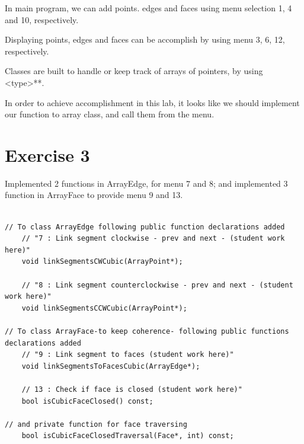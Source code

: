 \documentclass{article}
\begin{document}
In main program, we can add points. edges and faces using menu selection 1, 4 and 10, respectively.

Displaying points, edges and faces can be accomplish by using menu 3, 6, 12, respectively.

Classes are built to handle or keep track of arrays of pointers, by using <type>**.

In order to achieve accomplishment in this lab, it looks like we should implement our function to array class, and call them from the menu.

\section{Exercise 3}

Implemented 2 functions in ArrayEdge, for menu 7 and 8; and implemented 3 function in ArrayFace to provide menu 9 and 13.

\begin{lstlisting}[label=exercice-h, caption=Exercice.h]	

// To class ArrayEdge following public function declarations added
    // "7 : Link segment clockwise - prev and next - (student work here)"
    void linkSegmentsCWCubic(ArrayPoint*);

    // "8 : Link segment counterclockwise - prev and next - (student work here)"
    void linkSegmentsCCWCubic(ArrayPoint*);
    
// To class ArrayFace-to keep coherence- following public functions declarations added
    // "9 : Link segment to faces (student work here)"
    void linkSegmentsToFacesCubic(ArrayEdge*);

    // 13 : Check if face is closed (student work here)"
    bool isCubicFaceClosed() const;
    
// and private function for face traversing
	bool isCubicFaceClosedTraversal(Face*, int) const;

\end{lstlisting}


\null







 
\end{document}
